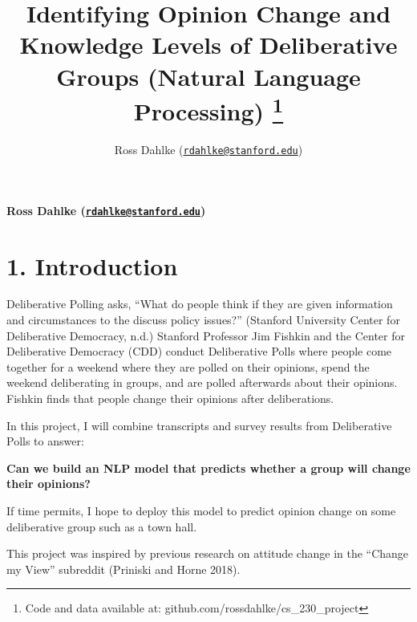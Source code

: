 \documentclass[12pt,]{article}
\title{Identifying Opinion Change and Knowledge Levels of Deliberative Groups
(Natural Language Processing) \thanks{Code and data available at: github.com/rossdahlke/cs\_230\_project}  }
\author{\Large Ross Dahlke
(\href{mailto:rdahlke@stanford.edu}{\nolinkurl{rdahlke@stanford.edu}})\vspace{0.05in} \newline\normalsize\emph{}  }
\date{}
\newcommand*{\authorfont}{\fontfamily{phv}\selectfont}
\begin{document}
	
%

{%
\setlength{\parindent}{0pt}
\thispagestyle{plain}
{\fontsize{18}{20}\selectfont\raggedright 
\maketitle  %

}

{
   \vskip 13.5pt\relax \normalsize\fontsize{11}{12} 
\textbf{\authorfont Ross Dahlke
(\href{mailto:rdahlke@stanford.edu}{\nolinkurl{rdahlke@stanford.edu}})} \hskip 15pt \emph{\small }   

}

}






\vskip -8.5pt



\noindent \doublespacing 

\hypertarget{introduction}{%
\section{1. Introduction}\label{introduction}}

Deliberative Polling asks, ``What do people think if they are given
information and circumstances to the discuss policy issues?'' (Stanford
University Center for Deliberative Democracy, n.d.) Stanford Professor
Jim Fishkin and the Center for Deliberative Democracy (CDD) conduct
Deliberative Polls where people come together for a weekend where they
are polled on their opinions, spend the weekend deliberating in groups,
and are polled afterwards about their opinions. Fishkin finds that
people change their opinions after deliberations.

In this project, I will combine transcripts and survey results from
Deliberative Polls to answer:

\textbf{Can we build an NLP model that predicts whether a group will
change their opinions?}

If time permits, I hope to deploy this model to predict opinion change
on some deliberative group such as a town hall.

This project was inspired by previous research on attitude change in the
``Change my View'' subreddit (Priniski and Horne 2018).
\end{document}
